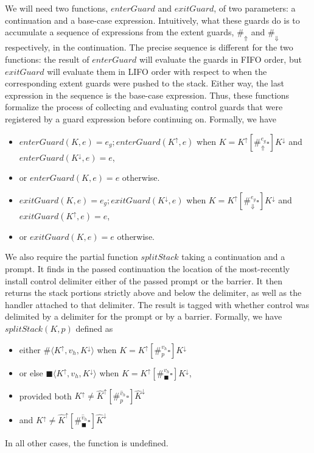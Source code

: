 \documentclass[11pt]{article}
\newcommand{\angles}[1]{\langle#1\rangle}
\begin{document}
We will need two functions, $enterGuard$ and $exitGuard$, of two parameters: a continuation and a base-case expression.
Intuitively, what these guards do is to accumulate a sequence of expressions from the extent guards, $\#_\Uparrow$ and $\#_\Downarrow$ respectively, in the continuation.
The precise sequence is different for the two functions: the result of $enterGuard$ will evaluate the guards in FIFO order, but $exitGuard$ will evaluate them in LIFO order with respect to when the corresponding extent guards were pushed to the stack.
Either way, the last expression in the sequence is the base-case expression.
Thus, these functions formalize the process of collecting and evaluating control guards that were registered by a guard expression before continuing on.
Formally, we have
\begin{itemize}
\item $enterGuard(K, e) = e_g;enterGuard(K^\uparrow, e)$ when $K = K^\uparrow[\#_\Uparrow^{e_g}\square]K^\downarrow$ and $enterGuard(K^\downarrow, e) = e$,
\item or $enterGuard(K, e) = e$ otherwise.
\item $exitGuard(K, e) = e_g;exitGuard(K^\downarrow, e)$ when $K = K^\uparrow[\#_\Downarrow^{e_g}\square]K^\downarrow$ and $exitGuard(K^\uparrow, e) = e$,
\item or $exitGuard(K, e) = e$ otherwise.
\end{itemize}


We also require the partial function $splitStack$ taking a continuation and a prompt.
It finds in the passed continuation the location of the most-recently install control delimiter either of the passed prompt or the barrier.
It then returns the stack portions strictly above and below the delimiter, as well as the handler attached to that delimiter.
The result is tagged with whether control was delimited by a delimiter for the prompt or by a barrier.
Formally, we have $splitStack(K, p)$ defined as
\begin{itemize}
\item either $\#\angles{K^\uparrow, v_h, K^\downarrow}$
      when $K = K^\uparrow[\#_p^{v_h}\square]K^\downarrow$
\item or else $\blacksquare\angles{K^\uparrow, v_h, K^\downarrow}$
      when $K = K^\uparrow[\#_\blacksquare^{v_h}\square]K^\downarrow$,
\item provided both $K^\uparrow \neq \hat{K}^\uparrow[\#_p^{\hat{v}_h}\square]\hat{K}^\downarrow$
\item and $K^\uparrow \neq \hat{K}^\uparrow[\#_\blacksquare^{\hat{v}_h}\square]\hat{K}^\downarrow$
\end{itemize}
In all other cases, the function is undefined.
\end{document}
